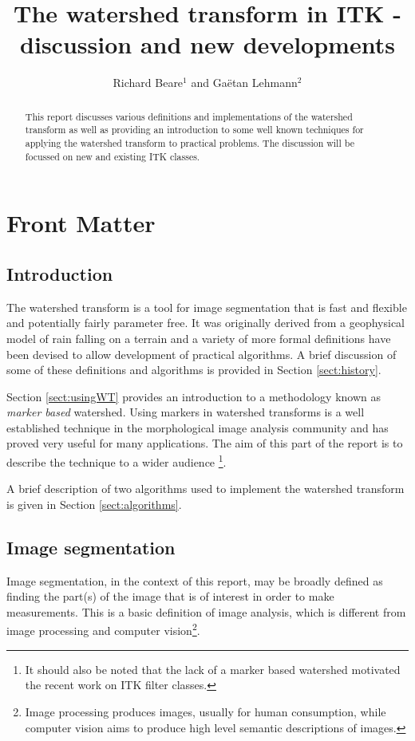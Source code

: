 \documentclass{InsightArticle}
\title{The watershed transform in ITK - discussion and new developments}
\author{Richard Beare{$^1$} {\small{and}} Ga\"etan Lehmann{$^2$}}
\begin{document}
\maketitle

\ifhtml
\chapter*{Front Matter\label{front}}
\fi


\begin{abstract}
\noindent
This report discusses various definitions and implementations of the
watershed transform as well as providing an introduction to some well
known techniques for applying the watershed transform to practical
problems. The discussion will be focussed on new and existing ITK
classes.
\end{abstract}

\tableofcontents
\section{Introduction}

The watershed transform is a tool for image segmentation that is fast
and flexible and potentially fairly parameter free. It was originally
derived from a geophysical model of rain falling on a terrain and a variety
of more formal definitions have been devised to allow development of
practical algorithms. A brief discussion of some of these definitions
and algorithms is provided in Section \ref{sect:history}. 

Section \ref{sect:usingWT} provides an introduction to a
methodology known as {\em marker based} watershed. Using markers in
watershed transforms is a well established technique in the
morphological image analysis community and has proved very useful for
many applications. The aim of this part of the report is to describe
the technique to a wider audience \footnote{It should also be noted
that the lack of a marker based watershed motivated the recent work on
ITK filter classes.}.

A brief description of two algorithms used to implement the watershed
transform is given in Section \ref{sect:algorithms}.

\section{Image segmentation}
Image segmentation, in the context of this report, may be broadly
defined as finding the part(s) of the image that is of interest in
order to make measurements. This is a basic definition of image
analysis, which is different from image processing and computer
vision\footnote{Image processing produces images, usually for human
consumption, while computer vision aims to produce high level semantic
descriptions of images.}.
\end{document}
